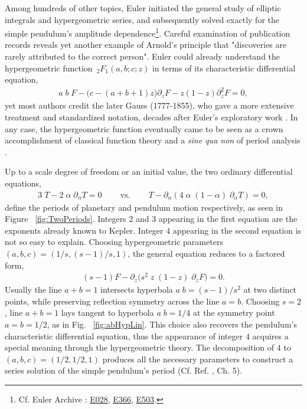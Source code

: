 \documentclass[nofootinbib,preprint]{revtex4-1}
\begin{document}
Among hundreds of other topics, Euler initiated the general study of elliptic integrals and 
hypergeometric series, and subsequently solved exactly for the simple pendulum's amplitude 
dependence\footnote{Cf. Euler Archive \cite{EULER2019}:  
\href{http://eulerarchive.maa.org/pages/E028.html}{E028}, 
\href{http://eulerarchive.maa.org/pages/E366.html}{E366},
\href{http://eulerarchive.maa.org/pages/E503.html}{E503}.}. Careful 
examination of publication records reveals yet another example of Arnold's principle that 
"discoveries are rarely attributed to the correct person". Euler could already understand 
the hypergeometric function $\,_2 F_1(a,b;c;z)$ in terms of its characteristic differential 
equation, 
\begin{eqnarray}
a \;b\; F - \big(c-(a+b+1)z\big) \partial_{z}F - z(1-z)\partial_{z}^2 F = 0,  \nonumber
\end{eqnarray}
yet most authors credit the later Gauss (1777-1855), who gave a more extensive treatment 
and standardized notation, decades after Euler's exploratory work \cite{DUTKA84}. In any case, 
the hypergeometric function eventually came to be seen as a crown accomplishment of classical 
function theory and a \textit{sine qua non} of period analysis \cite{KZ2001}. 

Up to a scale degree of freedom or an initial value, the two ordinary 
differential equations,
\begin{eqnarray}
3\;T-2\;\alpha \;\partial_{\alpha}T=0 \;\;\;\;\;\;\;\; \text{vs.} \nonumber
 \;\;\;\;\;\;\;\; T-\partial_{\alpha}(4\;\alpha\;(1-\alpha)\;\partial_{\alpha}T)=0,
\end{eqnarray}
define the periods of planetary and pendulum motion respectively, as seen in Figure ~\ref{fig:TwoPeriods}.  
Integers $2$ and $3$ appearing in the first equation are the exponents already known to Kepler. 
Integer $4$ appearing in the second equation is not so easy to explain. Choosing hypergeometric parameters 
$(a,b,c)=(1/s,(s-1)/s,1)$, the general equation reduces to a factored form,
\begin{eqnarray}
(s-1)F-\partial_{z}\big(s^{2}\;z\;(1-z)\;\partial_{z}F\big)=0. \nonumber
\end{eqnarray}
Usually the line $a+b=1$ intersects hyperbola $a\;b=(s-1)/s^2$ at two distinct points, 
while preserving reflection symmetry across the line $a=b$. Choosing $s=2$, line $a+b=1$ 
lays tangent to hyperbola $a\;b=1/4$ at the symmetry point $a=b=1/2$, as in Fig.
~\ref{fig:abHypLin}. This choice also recovers the pendulum's characteristic 
differential equation, thus the appearance of integer $4$ acquires a special meaning 
through the hypergeometric theory. The decomposition of $4$ to $(a,b,c)=(1/2,1/2,1)$ 
produces all the necessary parameters to construct a series solution of the simple 
pendulum's period (Cf. Ref. \cite{GRAHAM1994}, Ch. 5).
\end{document}

